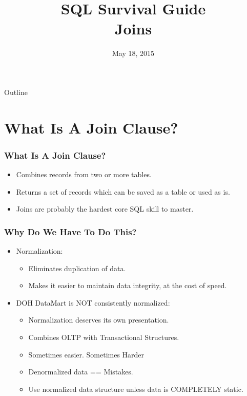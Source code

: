 \documentclass{beamer}
\title[SQL Survival Guide]{SQL Survival Guide\\Joins}
\institute{Office of Quality and Patient Safety}
\date{May 18, 2015}
\begin{document}
\begin{frame}
  \titlepage
\end{frame}

\begin{frame}{Outline}
  \tableofcontents
\end{frame}



\section{What Is A Join Clause?} %

\begin{frame}
  \frametitle{What Is A Join Clause?}
  \pause
  \begin{itemize}
  \item Combines records from two or more tables.
  \item Returns a set of records which can be saved as a table or used
    as is.
  \item Joins are probably the hardest core SQL skill to master.
  \end{itemize}
\end{frame}  

\begin{frame}
  \frametitle{Why Do We Have To Do This?}
  \begin{itemize}
  \item Normalization: 
    \begin{itemize}
    \item Eliminates duplication of data.
    \item Makes it easier to maintain data integrity, at the cost of
      speed.
    \end{itemize}
  \item DOH DataMart is NOT consistently normalized:
    \begin{itemize}
    \item Normalization deserves its own presentation.
    \item Combines OLTP with Transactional Structures.
    \item Sometimes easier. Sometimes Harder
    \item Denormalized data == Mistakes.
    \item Use normalized data structure unless data is COMPLETELY static.
    \end{itemize}
  \end{itemize}
\end{frame}  
\end{document}
